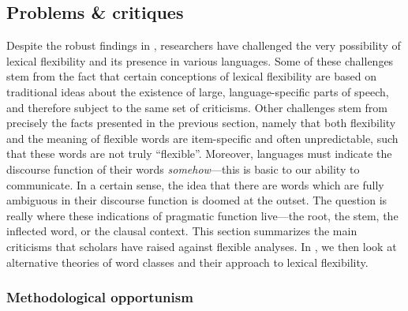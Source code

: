 \subsection{Problems \& critiques}
\label{sec:2.3.3}

Despite the robust findings in , researchers have challenged the very possibility of lexical flexibility and its presence in various languages. Some of these challenges stem from the fact that certain conceptions of lexical flexibility are based on traditional ideas about the existence of large, language-specific parts of speech, and therefore subject to the same set of criticisms. Other challenges stem from precisely the facts presented in the previous section, namely that both flexibility and the meaning of flexible words are item-specific and often unpredictable, such that these words are not truly \enquote{flexible}. Moreover, languages must indicate the discourse function of their words \emph{somehow}—this is basic to our ability to communicate. In a certain sense, the idea that there are words which are fully ambiguous in their discourse function is doomed at the outset. The question is really where these indications of pragmatic function live—the root, the stem, the inflected word, or the clausal context. This section summarizes the main criticisms that scholars have raised against flexible analyses. In , we then look at alternative theories of word classes and their approach to lexical flexibility.

\subsubsection{Methodological opportunism}
\label{sec:2.3.3.1}

